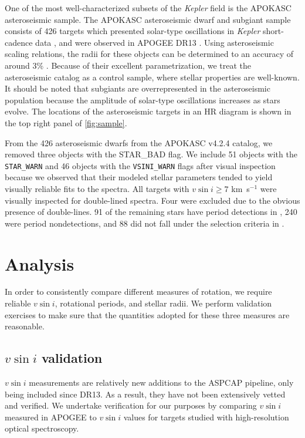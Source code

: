 \documentclass[manuscript]{aastex6}
\newcommand{\vsini}{\ensuremath{v \sin i}}
\newcommand{\Kepler}{\mbox{\textit{Kepler}}}
\newcommand{\kms}{\textrm{ km~s}\ensuremath{^{-1}}}
\newcommand{\STARWARN}{\texttt{STAR\_WARN}}
\newcommand{\VSINIWARN}{\texttt{VSINI\_WARN}}
\begin{document}
One of the most well-characterized subsets of the \Kepler{} field is the
APOKASC asteroseismic sample. The APOKASC asteroseismic dwarf and subgiant 
sample consists of 426 targets which presented solar-type oscillations in 
\Kepler{} short-cadence data \citep{Chaplin11}, and were observed in APOGEE DR13
\citep{Majewski17}. Using asteroseismic scaling relations, the radii
for these objects can be determined to an accuracy of around 3\%
\citep{Serenelli17}. Because of their excellent parametrization, we treat the
asteroseismic catalog as a control sample, where stellar properties are
well-known. It should be noted that subgiants are overrepresented in
the asteroseismic population because the amplitude of solar-type oscillations 
increases as stars evolve. The locations of the asteroseismic targets in an HR
diagram is shown in the top right panel of \cref{fig:sample}.

From the 426 asteroseismic dwarfs from the APOKASC v4.2.4 catalog, we removed 
three objects with the STAR\_BAD flag. We include 51 objects with 
the \STARWARN{} and 46 objects with the \VSINIWARN{} flags after visual 
inspection because we observed that their modeled stellar parameters tended to
yield visually reliable fits to the spectra.  All targets with \(\vsini \ge
7\) \kms{} were visually
inspected for double-lined spectra. Four were excluded due to the obvious
presence of double-lines. 91 of the remaining stars have period detections in 
\citet{McQuillan14}, 240 were period nondetections, and 88 did not fall under 
the selection criteria in \citet{McQuillan14}. 

\section{Analysis}
\label{sec:analysis}

In order to consistently compare different measures of rotation, we require 
reliable \vsini{}, rotational periods, and stellar radii. We perform validation
exercises to make sure that the quantities adopted for these three measures are 
reasonable.


\subsection{\vsini{} validation}
\label{sec:vsini_check}

\vsini{} measurements are relatively new additions to the ASPCAP pipeline, only
being included since DR13. As a result, they have not been extensively vetted and 
verified. We undertake verification for our purposes by comparing \vsini{} 
measured in APOGEE to \vsini{} values for
targets studied with high-resolution optical spectroscopy. 
\end{document}
